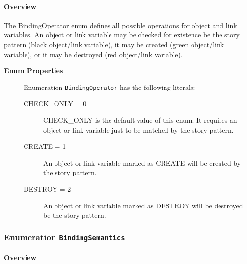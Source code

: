 \paragraph{Overview}
	
			
The BindingOperator enum defines all possible operations for object and link variables. An object or link variable may be checked for existence be the story pattern (black object/link variable), it may be created (green object/link variable), or it may be destroyed (red object/link variable).	
		
	


\begin{description}

	\item[\textbf{Enum Properties}] Enumeration \texttt{BindingOperator} has the following literals:

	\begin{description}
		
		\item[CHECK\_ONLY = 0]
		\hspace{\fill}
		\nopagebreak
		
CHECK\_ONLY is the default value of this enum. It requires an object or link variable just to be matched by the story pattern.	

		\item[CREATE = 1]
		\hspace{\fill}
		\nopagebreak
		
An object or link variable marked as CREATE will be created by the story pattern.	

		\item[DESTROY = 2]
		\hspace{\fill}
		\nopagebreak
		
An object or link variable marked as DESTROY will be destroyed be the story pattern.	
 
	\end{description}

\end{description}



\subsubsection{\Large{Enumeration \bfseries \texttt{BindingSemantics}\normalfont}}
\label{cls:storydiagrams::patterns::BindingSemantics} 
\paragraph{Overview}
	
